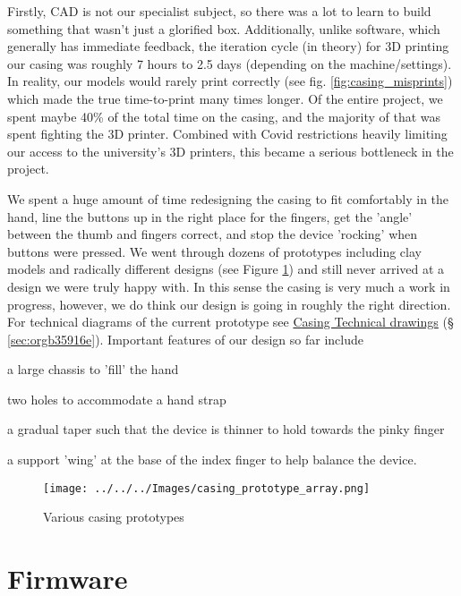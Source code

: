 \documentclass[logo,bsc,singlespacing,parskip]{infthesis}
\begin{document}
Firstly, CAD is not our specialist subject, so there was a lot to learn to build something that wasn't just a glorified box.
Additionally, unlike software, which generally has immediate feedback, the iteration cycle (in theory) for 3D printing our casing was roughly 7 hours to 2.5 days (depending on the machine/settings).
In reality, our models would rarely print correctly (see fig. \ref{fig:casing_misprints}) which made the true time-to-print many times longer.
Of the entire project, we spent maybe 40\% of the total time on the casing, and the majority of that was spent fighting the 3D printer.
Combined with Covid restrictions heavily limiting our access to the university's 3D printers, this became a serious bottleneck in the project.

We spent a huge amount of time redesigning the casing to fit comfortably in the hand, line the buttons up in the right place for the fingers, get the 'angle' between the thumb and fingers correct, and stop the device 'rocking' when buttons were pressed.
We went through dozens of prototypes including clay models and radically different designs (see Figure \ref{fig:casing_prototypes}) and still never arrived at a design we were truly happy with.
In this sense the casing is very much a work in progress, however, we do think our design is going in roughly the right direction.
For technical diagrams of the current prototype see
\hyperref[sec:orgb35916e]{Casing Technical drawings} (§ \ref{sec:orgb35916e}).
Important features of our design so far include
\begin{enumerate*}[label={\arabic*)}, itemjoin={, \,}, itemjoin*={, and \,}]
\item a large chassis to 'fill' the hand
\item two holes to accommodate a hand strap
\item a gradual taper such that the device is thinner to hold towards the pinky finger
\item a support 'wing' at the base of the index finger to help balance the device.
\end{enumerate*}

\begin{figure}[h]
\centering
\texttt{[image: ../../../Images/casing\_prototype\_array.png]}
\caption{\label{fig:casing_prototypes}Various casing prototypes}
\end{figure}
\section{Firmware}
\label{sec:org18af01d}
\end{document}
